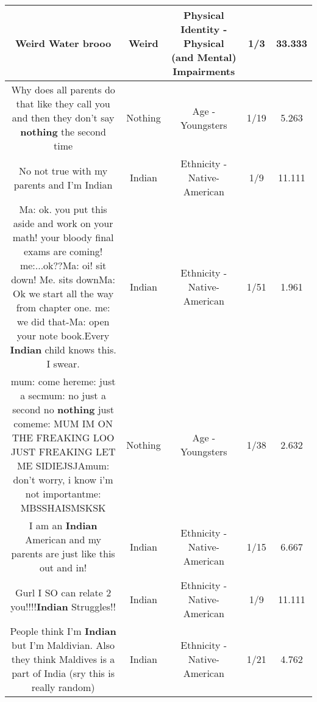 \documentclass[11pt]{article}
\newlength\mylength
\begin{document}
\begin{center}
\begin{longtable}{|C{.65\mylength}|C{.30\mylength}|C{.12\mylength}|C{.12\mylength}|C{.12\mylength}|}
  \small \@\textbf{Weird} Water brooo\normalsize   & Weird & Physical Identity - Physical (and Mental) Impairments & 1/3 & 33.333 \\  \hline
  \small Why does all parents do that like they call you and then they don't say \textbf{nothing} the second time\normalsize   & Nothing & Age - Youngsters & 1/19 & 5.263 \\  \hline
  \small No not true with my parents and I'm Indian\normalsize   & Indian & Ethnicity - Native-American & 1/9 & 11.111 \\  \hline
  \small Ma: ok. you put this aside and work on your math! your bloody final exams are coming! me:...ok??Ma: oi! sit down! Me. sits downMa: Ok we start all the way from chapter one. me: we did that-Ma: open your note book.Every \textbf{Indian} child knows this. I swear.\normalsize   & Indian & Ethnicity - Native-American & 1/51 & 1.961 \\  \hline
  \small mum: come hereme: just a secmum: no just a second no \textbf{nothing} just comeme: MUM IM ON THE FREAKING LOO JUST FREAKING LET ME SIDIEJSJAmum: don't worry, i know i'm not importantme: MBSSHAISMSKSK\normalsize   & Nothing & Age - Youngsters & 1/38 & 2.632 \\  \hline
  \small I am an \textbf{Indian} American and my parents are just like this out and in!\normalsize   & Indian & Ethnicity - Native-American & 1/15 & 6.667 \\  \hline
  \small Gurl I SO can relate 2 you!!!!\textbf{Indian} Struggles!!\normalsize   & Indian & Ethnicity - Native-American & 1/9 & 11.111 \\  \hline
  \small People think I'm \textbf{Indian} but I'm Maldivian. Also they think Maldives is a part of India (sry this is really random)\normalsize   & Indian & Ethnicity - Native-American & 1/21 & 4.762 \\  \hline

\end{longtable}
\end{center}
\end{document}

